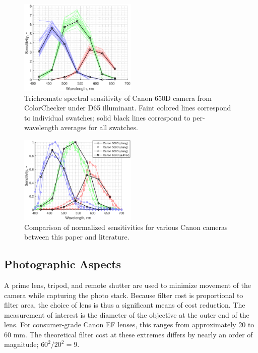 \documentclass[twocolumn,10pt]{asme2ej}
\begin{document}
\begin{figure}
\centering
\includegraphics[width=0.5\textwidth]{canon_650d_sensitivity.eps}
\caption{Trichromate spectral sensitivity of Canon 650D camera from ColorChecker under D65 illuminant. Faint colored lines correspond to individual swatches; solid black lines correspond to per-wavelength averages for all swatches.}
\label{canon_650d_sensitivity}
\end{figure}

\begin{figure}
\centering
\includegraphics[width=0.5\textwidth]{camera_spectral_sensitivities.eps}
\caption{Comparison of normalized sensitivities for various Canon cameras between this paper and literature. \cite{Jiang}}
\label{camera_spectral_sensitivities}
\end{figure}

\subsection{Photographic Aspects}
\label{photographic}

 A prime lens, tripod, and remote shutter are used to minimize movement of the camera while capturing the photo stack. Because filter cost is proportional to filter area, the choice of lens is thus a significant means of cost reduction. The measurement of interest is the diameter of the objective at the outer end of the lens. For consumer-grade Canon EF lenses, this ranges from approximately 20 to 60 mm. The theoretical filter cost at these extremes differs by nearly an order of magnitude; $60^2 / 20^2 = 9$.
\end{document}
